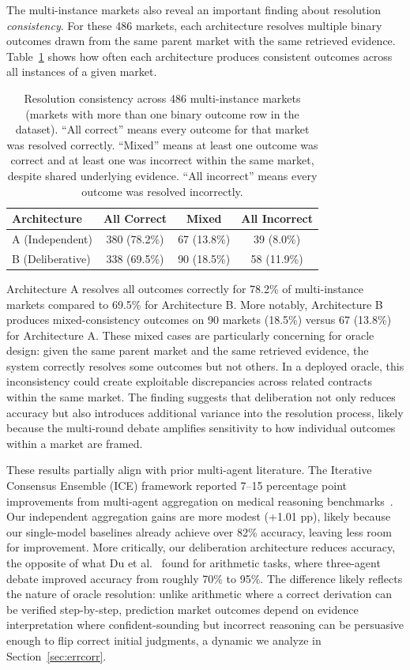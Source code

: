 The multi-instance markets also reveal an important finding about resolution \emph{consistency}. For these 486 markets, each architecture resolves multiple binary outcomes drawn from the same parent market with the same retrieved evidence. Table~\ref{tab:consistency} shows how often each architecture produces consistent outcomes across all instances of a given market.

\begin{table}[t]
\centering
\caption{Resolution consistency across 486 multi-instance markets (markets with more than one binary outcome row in the dataset). ``All correct'' means every outcome for that market was resolved correctly. ``Mixed'' means at least one outcome was correct and at least one was incorrect within the same market, despite shared underlying evidence. ``All incorrect'' means every outcome was resolved incorrectly.}
\label{tab:consistency}
\begin{tabular}{lccc}
\toprule
\textbf{Architecture} & \textbf{All Correct} & \textbf{Mixed} & \textbf{All Incorrect} \\
\midrule
A (Independent)  & 380 (78.2\%) & 67 (13.8\%) & 39 (8.0\%) \\
B (Deliberative) & 338 (69.5\%) & 90 (18.5\%) & 58 (11.9\%) \\
\bottomrule
\end{tabular}
\end{table}

Architecture A resolves all outcomes correctly for 78.2\% of multi-instance markets compared to 69.5\% for Architecture B. More notably, Architecture B produces mixed-consistency outcomes on 90 markets (18.5\%) versus 67 (13.8\%) for Architecture A. These mixed cases are particularly concerning for oracle design: given the same parent market and the same retrieved evidence, the system correctly resolves some outcomes but not others. In a deployed oracle, this inconsistency could create exploitable discrepancies across related contracts within the same market. The finding suggests that deliberation not only reduces accuracy but also introduces additional variance into the resolution process, likely because the multi-round debate amplifies sensitivity to how individual outcomes within a market are framed.

These results partially align with prior multi-agent literature. The Iterative Consensus Ensemble (ICE) framework reported 7--15 percentage point improvements from multi-agent aggregation on medical reasoning benchmarks~\cite{omar2025ice}. Our independent aggregation gains are more modest (+1.01 pp), likely because our single-model baselines already achieve over 82\% accuracy, leaving less room for improvement. More critically, our deliberation architecture reduces accuracy, the opposite of what Du et al.~\cite{du2023debate} found for arithmetic tasks, where three-agent debate improved accuracy from roughly 70\% to 95\%. The difference likely reflects the nature of oracle resolution: unlike arithmetic where a correct derivation can be verified step-by-step, prediction market outcomes depend on evidence interpretation where confident-sounding but incorrect reasoning can be persuasive enough to flip correct initial judgments, a dynamic we analyze in Section~\ref{sec:errcorr}.

